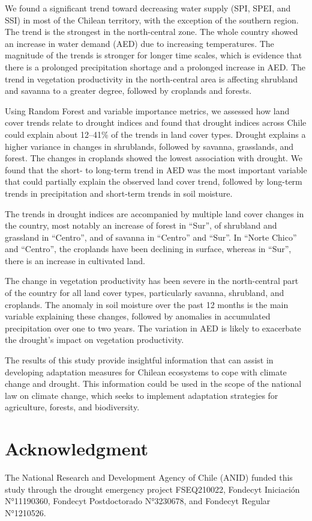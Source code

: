 \documentclass[
  authoryear,
  preprint,
  3p,
  onecolumn]{elsarticle}
\begin{document}
We found a significant trend toward decreasing water supply (SPI, SPEI,
and SSI) in most of the Chilean territory, with the exception of the
southern region. The trend is the strongest in the north-central zone.
The whole country showed an increase in water demand (AED) due to
increasing temperatures. The magnitude of the trends is stronger for
longer time scales, which is evidence that there is a prolonged
precipitation shortage and a prolonged increase in AED. The trend in
vegetation productivity in the north-central area is affecting shrubland
and savanna to a greater degree, followed by croplands and forests.

Using Random Forest and variable importance metrics, we assessed how
land cover trends relate to drought indices and found that drought
indices across Chile could explain about 12--41\% of the trends in land
cover types. Drought explains a higher variance in changes in
shrublands, followed by savanna, grasslands, and forest. The changes in
croplands showed the lowest association with drought. We found that the
short- to long-term trend in AED was the most important variable that
could partially explain the observed land cover trend, followed by
long-term trends in precipitation and short-term trends in soil
moisture.

The trends in drought indices are accompanied by multiple land cover
changes in the country, most notably an increase of forest in ``Sur'',
of shrubland and grassland in ``Centro'', and of savanna in ``Centro''
and ``Sur''. In ``Norte Chico'' and ``Centro'', the croplands have been
declining in surface, whereas in ``Sur'', there is an increase in
cultivated land.

The change in vegetation productivity has been severe in the
north-central part of the country for all land cover types, particularly
savanna, shrubland, and croplands. The anomaly in soil moisture over the
past 12 months is the main variable explaining these changes, followed
by anomalies in accumulated precipitation over one to two years. The
variation in AED is likely to exacerbate the drought's impact on
vegetation productivity.

The results of this study provide insightful information that can assist
in developing adaptation measures for Chilean ecosystems to cope with
climate change and drought. This information could be used in the scope
of the national law on climate change, which seeks to implement
adaptation strategies for agriculture, forests, and biodiversity.

\section{Acknowledgment}\label{acknowledgment}

The National Research and Development Agency of Chile (ANID) funded this
study through the drought emergency project FSEQ210022, Fondecyt
Iniciación N°11190360, Fondecyt Postdoctorado N°3230678, and Fondecyt
Regular N°1210526.


\renewcommand\refname{References}
  
\end{document}
